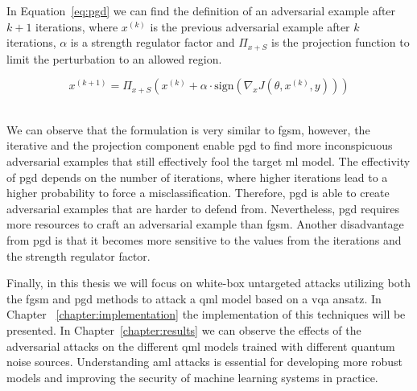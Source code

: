 In Equation~\ref{eq:pgd} we can find the definition of an
adversarial example after \(k+1\) iterations, where \(x^{(k)}\)
is the previous adversarial example after \(k\) iterations,
\(\alpha\) is a strength regulator factor and \(\Pi_{x+S}\)
is the projection function to limit the perturbation to
an allowed region. \

\begin{equation}\label{eq:pgd}
  x^{(k+1)} = \Pi_{x+S} \left( x^{(k)} + \alpha \cdot \text{sign}(\nabla_x J(\theta, x^{(k)}, y)) \right)
\end{equation} \

We can observe that the formulation is very similar to \ac{fgsm},
however, the iterative and the projection component enable \ac{pgd}
to find more inconspicuous adversarial examples that still effectively
fool the target \ac{ml} model. The effectivity of \ac{pgd} depends
on the number of iterations, where higher iterations lead to a higher
probability to force a misclassification. Therefore, \ac{pgd} is able to
create adversarial examples that are harder to defend from.
Nevertheless, \ac{pgd} requires more resources to craft an
adversarial example than \ac{fgsm}. Another disadvantage from
\ac{pgd} is that it becomes more sensitive to the values from
the iterations and the strength regulator factor. \

Finally, in this thesis we will focus on white-box untargeted attacks
utilizing both the \ac{fgsm} and \ac{pgd} methods to attack
a \ac{qml} model based on a \ac{vqa} ansatz. In Chapter
~\ref{chapter:implementation} the implementation of this techniques
will be presented. In Chapter~\ref{chapter:results} we can observe
the effects of the adversarial attacks on the different \ac{qml}
models trained with different quantum noise sources. Understanding
\ac{aml} attacks is essential for developing more robust models
and improving the security of machine learning systems in practice. \